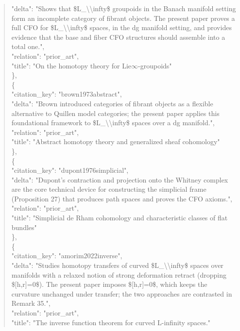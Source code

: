\documentclass[11pt]{article}
\begin{document}
\begin{quote}
      "delta": "Shows that \$L\_\textbackslash{}\textbackslash{}infty\$ groupoids in the Banach manifold setting form an incomplete category of fibrant objects. The present paper proves a full CFO for \$L\_\textbackslash{}\textbackslash{}infty\$ spaces, in the dg manifold setting, and provides evidence that the base and fiber CFO structures should assemble into a total one.",\\
      "relation": "prior\_art",\\
      "title": "On the homotopy theory for Lie\ensuremath{\infty}-groupoids"\\
    \},\\
    \{\\
      "citation\_key": "brown1973abstract",\\
      "delta": "Brown introduced categories of fibrant objects as a flexible alternative to Quillen model categories; the present paper applies this foundational framework to \$L\_\textbackslash{}\textbackslash{}infty\$ spaces over a dg manifold.",\\
      "relation": "prior\_art",\\
      "title": "Abstract homotopy theory and generalized sheaf cohomology"\\
    \},\\
    \{\\
      "citation\_key": "dupont1976simplicial",\\
      "delta": "Dupont's contraction and projection onto the Whitney complex are the core technical device for constructing the simplicial frame (Proposition 27) that produces path spaces and proves the CFO axioms.",\\
      "relation": "prior\_art",\\
      "title": "Simplicial de Rham cohomology and characteristic classes of flat bundles"\\
    \},\\
    \{\\
      "citation\_key": "amorim2022inverse",\\
      "delta": "Studies homotopy transfers of curved \$L\_\textbackslash{}\textbackslash{}infty\$ spaces over manifolds with a relaxed notion of strong deformation retract (dropping \$[h,r]=0\$). The present paper imposes \$[h,r]=0\$, which keeps the curvature unchanged under transfer; the two approaches are contrasted in Remark 35.",\\
      "relation": "prior\_art",\\
      "title": "The inverse function theorem for curved L-infinity spaces."\\

\end{quote}
\end{document}
